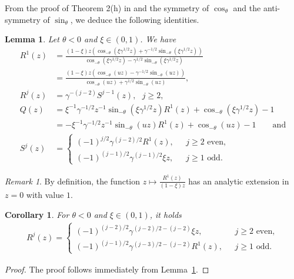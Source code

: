 \documentclass[12pt]{article}
\newcommand{\Q}{\mathbb{Q}} %
\newcommand{\R}{\mathbb{R}} %
\newcommand{\1}{\mathds{1}}
\theoremstyle{definition}
\theoremstyle{plain}
\newtheorem{Lemma}[definition]{Lemma}
\newtheorem{Corollary}[definition]{Corollary}
\theoremstyle{remark}
\newtheorem{Remark}{Remark}
\begin{document}
 From the proof of Theorem 2(h) in \cite{AR} and the symmetry of $\cos_\theta$ and the anti-symmetry of $\sin_\theta$, we deduce the following identities.
\begin{Lemma}\label{gf_other_neg_theta}
   Let $\theta<0$ and $\xi\in(0,1)$. We have
    \begin{align*}
        R^1(z)&=\frac{(1-\xi)z(\cos_{-\theta}(\xi\gamma^{1/2}z)+\gamma^{-1/2}\sin_{-\theta}(\xi\gamma^{1/2}z))}{\cos_{-\theta}(\xi\gamma^{1/2}z)-\gamma^{1/2}\sin_{-\theta}(\xi\gamma^{1/2}z)}
        \\&=\frac{(1-\xi)z(\cos_{-\theta}(uz)-\gamma^{-1/2}\sin_{-\theta}(uz))}{\cos_{-\theta}(uz)+\gamma^{1/2}\sin_{-\theta}(uz)}, %
        \\R^j(z)&=\gamma^{-(j-2)}S^{j-1}(z),~~~j\ge2,
        \\Q(z)&=\xi^{-1}\gamma^{-1/2}z^{-1}\sin_{-\theta}(\xi\gamma^{1/2}z) R^1(z)+\cos_{-\theta}(\xi\gamma^{1/2}z)-1
        \\&=-\xi^{-1}\gamma^{-1/2}z^{-1}\sin_{-\theta}(uz) R^1(z)+\cos_{-\theta}(uz)-1\qquad \text{and}
\\
    S^j(z)& =\begin{cases}
        (-1)^{j/2}\gamma^{(j-2)/2}R^1(z),~~~&j\ge 2\text{ even},
        \\(-1)^{(j-1)/2}\gamma^{(j-1)/2}\xi z,~~~&j\ge 1\text{ odd}.
    \end{cases}
\end{align*}
\end{Lemma}
\begin{Remark}\label{R1_analytic_0}
    By definition, the function $z\mapsto \frac{R^1(z)}{(1-\xi) z}$ has an analytic extension in $z=0$ with value $1$.
\end{Remark}
\begin{Corollary}\label{Rj_neg_theta}
  For $\theta<0$ and $\xi\in(0,1)$, it holds
    \begin{align*}
        R^j(z)=\begin{cases}
        (-1)^{(j-2)/2}\gamma^{(j-2)/2-(j-2)}\xi z,~~~&j\ge 2\text{ even},
        \\(-1)^{(j-1)/2}\gamma^{(j-3)/2-(j-2)}R^1(z),~~~&j\ge 1\text{ odd}.
        \end{cases}
    \end{align*}
\end{Corollary}
\begin{proof}
    The proof follows immediately from Lemma~\ref{gf_other_neg_theta}.
\end{proof}
\end{document}
